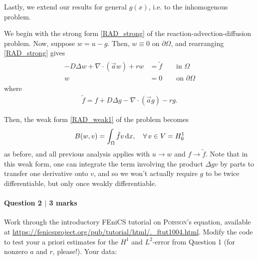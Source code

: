 \begin{solution}
Lastly, we extend our results for general $g(x)$, i.e. to the inhomogenous problem.

We begin with the strong form \eqref{RAD_strong} of the reaction-advection-diffusion problem.
Now, suppose $w = u-g$.
Then, $w \equiv 0$ on $\partial \Omega$, and rearranging \eqref{RAD_strong} gives
\begin{align*}\label{RAD_w_strong}
\begin{split}
-D\Delta w + \nabla \cdot (\vec{a} w) + rw
&= \tilde{f} \qquad \text{in } \Omega\\
w &= 0  \qquad \text{on } \partial\Omega
\end{split}
\end{align*}
where
\begin{align*}
\tilde{f} = f + D\Delta g - \nabla \cdot (\vec{a} g) - rg.
\end{align*}

Then, the weak form \eqref{RAD_weak1} of the problem becomes
\begin{align*}
B(w,v) = \int_\Omega \tilde{f} v \operatorname{d}\!{x},
\quad \forall \, v \in V = H^1_0
\end{align*}
as before, and all previous analysis applies with $u \rightarrow w$ and $f \rightarrow \tilde{f}$.
Note that in this weak form, one can integrate the term involving the product $\Delta g v$ by parts to transfer one derivative onto $v$, and so we won't actually require $g$ to be twice differentiable, but only once weakly differentiable.

\end{solution}


%
%
%
%

\newpage
\paragraph*{Question 2 $\vert$ 3 marks}%

Work through the introductory \textsf{FEniCS} tutorial on \textsc{Poisson}'s equation, available at \url{https://fenicsproject.org/pub/tutorial/html/._ftut1004.html}. Modify the code to test your a priori estimates for the $H^1$ and $L^2$-error from Question 1 (for nonzero $a$ and $r$, please!). Your data:

